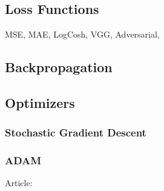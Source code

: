 \subsection{Loss Functions}
MSE, MAE, LogCosh, VGG, Adversarial, 

\subsection{Backpropagation}

\subsection{Optimizers}

\subsubsection{Stochastic Gradient Descent}


\subsubsection{ADAM}
Article: \cite{kingma2015adam}
